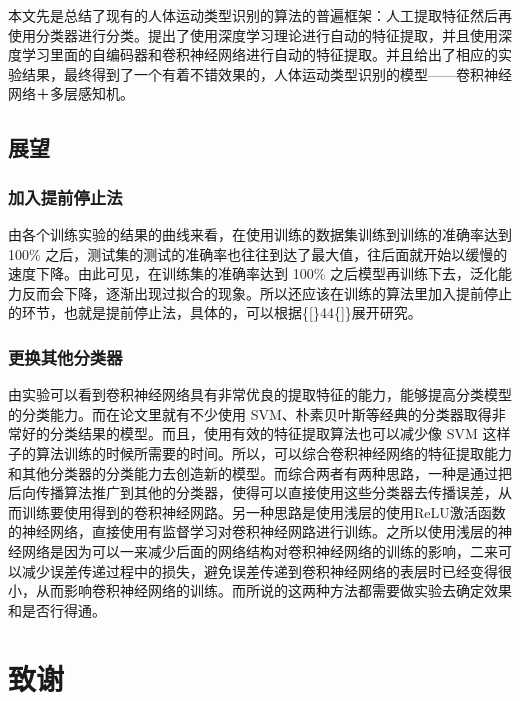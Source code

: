 本文先是总结了现有的人体运动类型识别的算法的普遍框架：人工提取特征然后再使用分类器进行分类。提出了使用深度学习理论进行自动的特征提取，并且使用深度学习里面的自编码器和卷积神经网络进行自动的特征提取。并且给出了相应的实验结果，最终得到了一个有着不错效果的，人体运动类型识别的模型------卷积神经网络＋多层感知机。

\subsection{展望}\label{ux5c55ux671b}

\subsubsection{加入提前停止法}\label{ux52a0ux5165ux63d0ux524dux505cux6b62ux6cd5}

由各个训练实验的结果的曲线来看，在使用训练的数据集训练到训练的准确率达到
100\%
之后，测试集的测试的准确率也往往到达了最大值，往后面就开始以缓慢的速度下降。由此可见，在训练集的准确率达到
100\%
之后模型再训练下去，泛化能力反而会下降，逐渐出现过拟合的现象。所以还应该在训练的算法里加入提前停止的环节，也就是提前停止法，具体的，可以根据\{{[}\}44\{{]}\}展开研究。

\subsubsection{更换其他分类器}\label{ux66f4ux6362ux5176ux4ed6ux5206ux7c7bux5668}

由实验可以看到卷积神经网络具有非常优良的提取特征的能力，能够提高分类模型的分类能力。而在论文里就有不少使用
SVM、朴素贝叶斯等经典的分类器取得非常好的分类结果的模型。而且，使用有效的特征提取算法也可以减少像
SVM
这样子的算法训练的时候所需要的时间。所以，可以综合卷积神经网络的特征提取能力和其他分类器的分类能力去创造新的模型。而综合两者有两种思路，一种是通过把后向传播算法推广到其他的分类器，使得可以直接使用这些分类器去传播误差，从而训练要使用得到的卷积神经网路。另一种思路是使用浅层的使用ReLU激活函数的神经网络，直接使用有监督学习对卷积神经网路进行训练。之所以使用浅层的神经网络是因为可以一来减少后面的网络结构对卷积神经网络的训练的影响，二来可以减少误差传递过程中的损失，避免误差传递到卷积神经网络的表层时已经变得很小，从而影响卷积神经网络的训练。而所说的这两种方法都需要做实验去确定效果和是否行得通。

\section{致谢}\label{ux81f4ux8c22}


